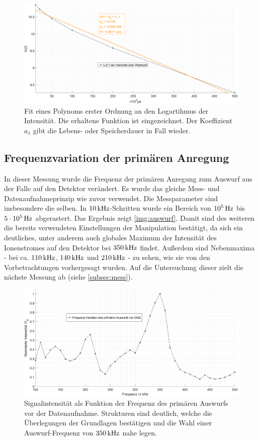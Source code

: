 \documentclass[numbers=noenddot,a4paper,notitlepage,twoside,BCOR15mm]{scrartcl}
\newcommand{\tenpo}[1]{ 10^{#1}}
\begin{document}
				\begin{figure}
					\includegraphics[width=\textwidth]{linear_fit_wartezeit.png}
					\caption{Fit eines Polynoms erster Ordnung an den Logartihmus der Intensität. Die erhaltene Funktion ist eingezeichnet. Der Koeffizient $a_1$ gibt die Lebens- oder Speicherdauer in Fall wieder.}\label{img:lin}
				\end{figure}

		\subsection{Frequenzvariation der primären Anregung}

			In dieser Messung wurde die Frequenz der primären Anregung zum Auswurf aus der Falle auf den Detektor verändert. Es wurde das gleiche Mess- und Datenaufnahmeprinzip wie zuvor verwendet. Die Messparameter sind insbesondere die selben. In $\unit[10]{kHz}$-Schritten wurde ein Bereich von $\unit[\tenpo{5}]{Hz}$ bis $\unit[5\cdot\tenpo{5}]{Hz}$ abgerastert. Das Ergebnis zeigt \autoref{img:auswurf}. Damit sind des weiteren die bereits verwendeten Einstellungen der Manipulation bestätigt, da sich ein deutliches, unter anderem auch globales Maximum der Intensität des Ionenstromes auf den Detektor bei $\unit[350]{kHz}$ findet. Außerdem sind Nebenmaxima - bei ca. $\unit[110]{kHz}$, $\unit[140]{kHz}$ und $\unit[210]{kHz}$ - zu sehen, wie sie von den Vorbetrachtungen vorhergesagt wurden. Auf die Untersuchung dieser zielt die nächste Messung ab (siehe \autoref{subsec:mess}).

				\begin{figure}
					\includegraphics[width=\textwidth]{freq_auswurf.png}
					\caption{Signalintensität als Funktion der Frequenz des primären Auswurfs vor der Datenaufnahme. Strukturen sind deutlich, welche die Überlegungen der Grundlagen bestätigen und die Wahl einer Auswurf-Frequenz von $\unit[350]{kHz}$ nahe legen.}\label{img:auswurf}
				\end{figure}
\end{document}
